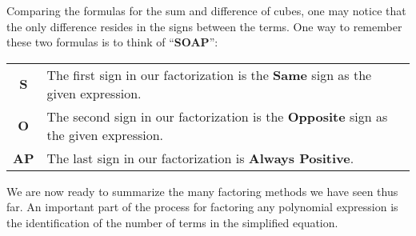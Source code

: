 \documentclass[12pt]{article}
\theoremstyle{definition}
\begin{document}
Comparing the formulas for the sum and difference of cubes, one may notice that the only difference resides in the signs between the terms. One way to remember these two formulas is to think of ``{\bf SOAP}'':
\begin{center}
\begin{tabular}{cl}
{\bf S} & The first sign in our factorization is the {\bf Same} sign as the given expression.\\
{\bf O} & The second sign in our factorization is the {\bf Opposite} sign as the given expression.\\
{\bf AP} & The last sign in our factorization is {\bf Always Positive}.
\end{tabular}
\end{center}
We are now ready to summarize the many factoring methods we have seen thus far. An important part of the process for factoring any polynomial expression is the identification of the number of terms in the simplified equation.
\end{document}
